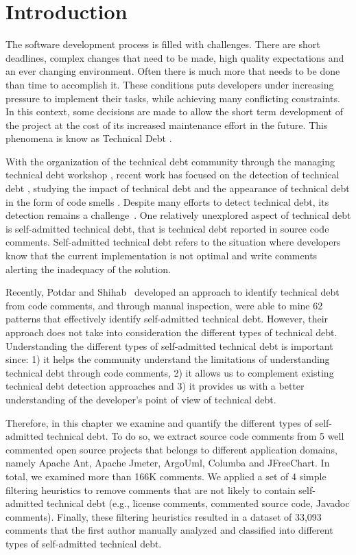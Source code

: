 
\section{Introduction}
\label{chap3:sec:introduction}

The software development process is filled with challenges. There are short deadlines, complex changes that need to be made, high quality expectations and an ever changing environment. Often there is much more that needs to be done than time to accomplish it. These conditions puts developers under increasing pressure to implement their tasks, while achieving many conflicting constraints. In this context, some decisions are made to allow the short term development of the project at the cost of its increased maintenance effort in the future. This phenomena is know as Technical Debt \cite{Cunningham1992WPM}. 

With the organization of the technical debt community through the managing technical debt workshop \cite{Falessi2014MTD}, recent work has focused on the detection of technical debt \cite{Potdar2014ICSME,Zazworka2013CSE}, studying the impact of technical debt \cite{Zazworka2011MTD}
and the appearance of technical debt in the form of code smells \cite{Fontana2012MTD}. Despite many efforts to detect technical debt, its detection remains a challenge~\cite{Potdar2014ICSME}. One relatively unexplored aspect of technical debt is self-admitted technical debt, that is technical debt reported in source code comments. Self-admitted technical debt refers to the situation where developers know that the current implementation is not optimal and write comments alerting the inadequacy of the solution. 

Recently, Potdar and Shihab~\cite{Potdar2014ICSME} developed an approach to identify technical debt from code comments, and through manual inspection, were able to mine 62 patterns that effectively identify self-admitted technical debt. However, their approach does not take into consideration the different types of technical debt. Understanding the different types of self-admitted technical debt is important since: 1) it helps the community understand the limitations of understanding technical debt through code comments, 2) it allows us to complement existing technical debt detection approaches and 3) it provides us with a better understanding of the developer's point of view of technical debt.

Therefore, in this chapter we examine and quantify the different types of self-admitted technical debt. To do so, we extract source code comments from 5 well commented open source projects that belongs to different application domains, namely Apache Ant, Apache Jmeter, ArgoUml, Columba and JFreeChart. In total, we examined more than 166K comments. We applied a set of 4 simple filtering heuristics to remove comments that are not likely to contain self-admitted technical debt (e.g., license comments, commented source code, Javadoc comments). Finally, these filtering heuristics resulted in a dataset of 33,093 comments that the first author manually analyzed and classified into different types of self-admitted technical debt.

